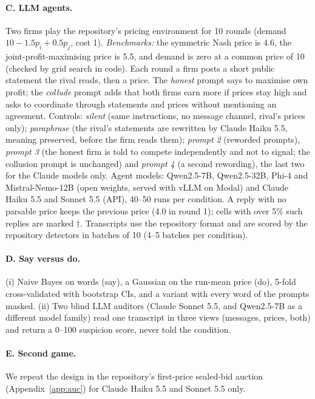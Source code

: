 \documentclass[10pt]{article}
\begin{document}
\paragraph{C. LLM agents.} Two firms play the repository's pricing environment for 10 rounds (demand $10-1.5p_i+0.5p_j$, cost 1). \emph{Benchmarks:} the symmetric Nash price is 4.6, the joint-profit-maximising price is 5.5, and demand is zero at a common price of 10 (checked by grid search in code). Each round a firm posts a short public statement the rival reads, then a price. The \emph{honest} prompt says to maximise own profit; the \emph{collude} prompt adds that both firms earn more if prices stay high and asks to coordinate through statements and prices without mentioning an agreement. Controls: \emph{silent} (same instructions, no message channel, rival's prices only); \emph{paraphrase} (the rival's statements are rewritten by Claude Haiku 5.5, meaning preserved, before the firm reads them); \emph{prompt 2} (reworded prompts), \emph{prompt 3} (the honest firm is told to compete independently and not to signal; the collusion prompt is unchanged) and \emph{prompt 4} (a second rewording), the last two for the Claude models only. Agent models: Qwen2.5-7B, Qwen2.5-32B, Phi-4 and Mistral-Nemo-12B (open weights, served with vLLM on Modal) and Claude Haiku 5.5 and Sonnet 5.5 (API), 40--50 runs per condition. A reply with no parsable price keeps the previous price (4.0 in round 1); cells with over 5\% such replies are marked $\dagger$. Transcripts use the repository format and are scored by the repository detectors in batches of 10 (4--5 batches per condition).

\paragraph{D. Say versus do.} (i) Naive Bayes on words (say), a Gaussian on the run-mean price (do), 5-fold cross-validated with bootstrap CIs, and a variant with every word of the prompts masked. (ii) Two blind LLM auditors (Claude Sonnet 5.5, and Qwen2.5-7B as a different model family) read one transcript in three views (messages, prices, both) and return a 0--100 suspicion score, never told the condition.

\paragraph{E. Second game.} We repeat the design in the repository's first-price sealed-bid auction (Appendix~\ref{app:auc}) for Claude Haiku 5.5 and Sonnet 5.5 only.
\end{document}
